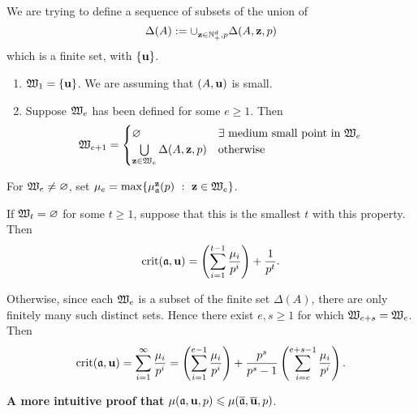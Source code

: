 \documentclass[11pt]{amsart}
\begin{document}

\begin{definition}  We are trying to define a sequence of subsets of the union of \[ \Delta(A) := \cup_{\mathbf{z} \in \mathbb{N}^d_+, p} \Delta(A, \mathbf{z}, p)\] which is a finite set, with $\{ \mathbf{u} \}$. 

\begin{enumerate}
\item  $\mathfrak{W}_1 = \{ \mathbf{u} \}$.  We are assuming that $(A, \mathbf{u})$ is small.
\item Suppose $\mathfrak{W}_e$ has been defined for some $e \geq 1$.  Then 
\[ \mathfrak{W}_{e+1} = \begin{cases} \varnothing & \exists \text{ medium small point in $\mathfrak{W}_e$}\\ \bigcup \limits_{\mathbf{z} \in \mathfrak{W}_e} \Delta(A, \mathbf{z},p) & \text{otherwise} \end{cases} \]
\end{enumerate}

\end{definition}


For $\mathfrak{W}_e \neq \varnothing$, set $\mu_e = \max \{ \mu_\ideala^{\vv{z}}(p) \ : \ \vv{z} \in \witt_e \}$.

If $\mathfrak{W}_t = \varnothing$ for some $t \geq 1$, suppose that this is the smallest $t$ with this property. Then 
\[
 \operatorname{crit}(\mathfrak{a}, \mathbf{u}) = \left( \sum_{i=1}^{t-1} \frac{\mu_i}{p^i}\right) +  \frac{1}{p^t}.
\]

Otherwise, since each $\mathfrak{W}_e$ is a subset of the finite set $\Delta(A)$, there are only finitely many such distinct sets.  Hence there exist $e, s \geq 1$ for which $\mathfrak{W}_{e+s} = \mathfrak{W}_e$.  
Then 
\[
 \operatorname{crit}(\mathfrak{a}, \mathbf{u}) = \sum_{i = 1}^\infty \frac{\mu_i}{p^i} = \left( \sum_{i=1}^{e-1} \frac{\mu_i}{p^i}\right) +  \frac{p^s}{p^s-1} \left(\sum_{i=e}^{e+s-1} \frac{\mu_i}{p^i}\right).
\]


\newpage

\textbf{A more intuitive proof that} $\mu(\mathfrak{a}, \mathbf{u}, p) \leqslant \mu(\overline{\mathfrak{a}}, \overline{\mathbf{u}}, p)$.

\vspace{.3cm}
\end{document}
